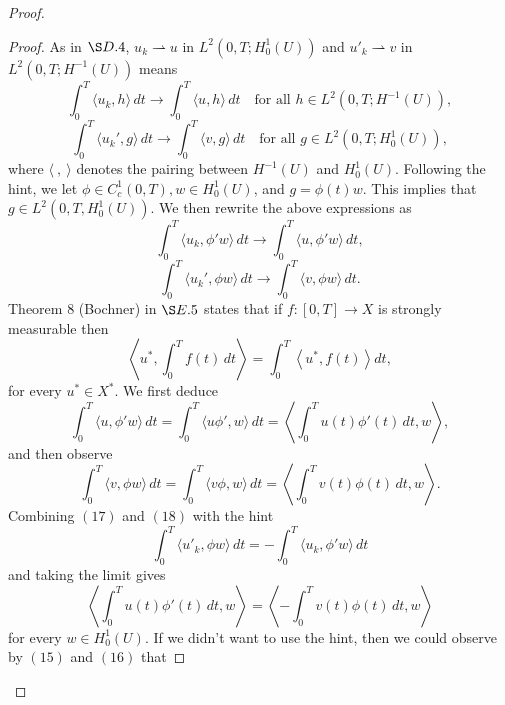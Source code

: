\documentclass{article}
\begin{document}
\begin{flushleft}
\begin{proof}
\begin{proof} As in $\S D.4$, $u_k \rightharpoonup u$ in $L^2(0,T;H_0^1(U))$ and $u'_k \rightharpoonup v$ in $L^2(0,T;H^{-1}(U))$ means
$$\int_0^T \langle u_k,h\rangle\,dt \to \int_0^T \langle u,h\rangle\,dt\quad \text{for all $h\in L^2(0,T;H^{-1}(U)),$}$$
$$\int_0^T \langle u_k',g\rangle\,dt \to \int_0^T \langle v,g\rangle\,dt\quad \text{for all $g\in L^2(0,T;H_0^1(U)),$}$$
 where $\langle~,~\rangle$ denotes the pairing between $H^{-1}(U)$ and $H_0^1(U)$. Following the hint, we let $\phi\in C_c^1(0,T), w\in H_0^1(U)$, and $g=\phi(t) w$. This implies that $g\in L^2(0,T,H_0^1(U))$. We then rewrite the above expressions as
\begin{equation}\int_0^T \langle u_k,\phi' w\rangle\,dt \to \int_0^T \langle u,\phi' w\rangle\,dt,\end{equation}
\begin{equation}\int_0^T \langle u_k',\phi w\rangle\,dt \to \int_0^T \langle v,\phi w\rangle\,dt.\end{equation}
Theorem $8$ (Bochner) in $\S E.5$ states that if $f:[0,T]\to X$ is strongly measurable then
$$\left\langle u^{\ast},\int_0^T f(t)\,dt\right\rangle = \int_0^T \left\langle u^{\ast},f(t)\right\rangle dt,$$
for every $u^{\ast}\in X^{\ast}$. We first deduce 
\begin{equation}\int_0^T \langle u, \phi' w\rangle \, dt = \int_0^T \langle u\phi' , w\rangle \, dt = \left\langle \int_0^T u(t)\phi'(t) \, dt , w\right \rangle,\end{equation}
and then observe
\begin{equation}\int_0^T \langle v, \phi w\rangle \, dt = \int_0^T \langle v\phi , w\rangle \, dt = \left\langle \int_0^T v(t)\phi(t) \, dt , w\right \rangle.\end{equation}
Combining $(17)$ and $(18)$ with the hint
$$\int_0^T \langle u'_k,\phi w\rangle \,dt = - \int_0^T \langle u_k,\phi' w\rangle \,dt$$
and taking the limit gives 
$$\left\langle \int_0^T u(t)\phi'(t) \, dt , w\right \rangle = \left\langle -\int_0^T v(t)\phi(t) \, dt , w\right \rangle$$
for every $w\in H^1_0(U)$. If we didn't want to use the hint, then we could observe by $(15)$ and $(16)$ that


\end{proof}
\end{proof}
\end{flushleft}
\end{document}
